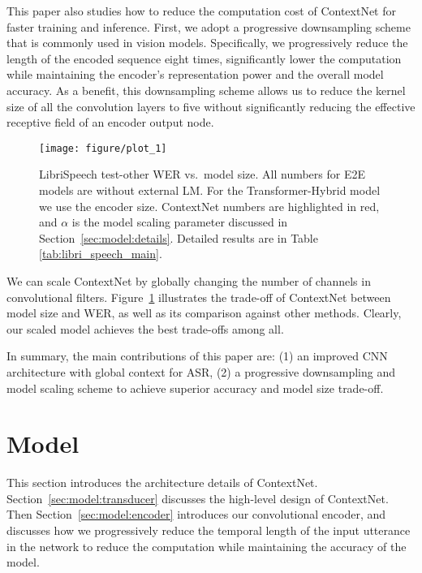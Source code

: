 \documentclass[a4paper]{article}
\newcommand{\netname}{ContextNet}
\begin{document}
This paper also studies how to reduce the computation cost of \netname{} for faster training and inference. First, we adopt a progressive downsampling scheme that is commonly used in vision models. Specifically, we progressively reduce the length of the encoded sequence eight times, significantly lower the computation while maintaining the encoder's representation power and the overall model accuracy. As a benefit, this downsampling scheme allows us to reduce the kernel size of all the convolution layers to five without significantly reducing the effective receptive field of an encoder output node.

\begin{figure}[t]
\begin{centering}
\texttt{[image: figure/plot\_1]}
\par\end{centering}
\caption{LibriSpeech test-other WER vs.\ model size. All numbers for E2E models are without external LM. For the Transformer-Hybrid model we use the encoder size. \netname{} numbers are highlighted in red, and $\alpha$ is the model scaling parameter discussed in Section~\ref{sec:model:details}. Detailed results are in Table \ref{tab:libri_speech_main}.}
\label{overall}
\end{figure}

We can scale \netname{} by globally changing the number of channels in convolutional filters. Figure~\ref{overall} illustrates the trade-off of {\netname} between model size and WER, as well as its comparison against other methods. Clearly, our scaled model achieves the best trade-offs among all.

In summary, the main contributions of this paper are: (1) an improved CNN architecture with global context for ASR, (2) a progressive downsampling and model scaling scheme to achieve superior accuracy and model size trade-off. \vspace{-0.05in}
\section{Model}
\vspace{-0.05in}
This section introduces the architecture details of \netname. Section~\ref{sec:model:transducer} discusses the high-level design of \netname. Then Section~\ref{sec:model:encoder} introduces our convolutional encoder, and discusses how we progressively reduce the temporal length of the input utterance in the network to reduce the computation while maintaining the accuracy of the model.  
\vspace{-0.05in}
\end{document}
